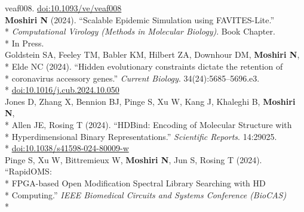 \documentclass[margin,line]{res}
\begin{document}
\begin{resume}
\hspace*{7mm} veaf008. \href{https://doi.org/10.1093/ve/veaf008}{doi:10.1093/ve/veaf008}\\
\hspace*{4mm} \textbf{Moshiri N} (2024). ``Scalable Epidemic Simulation using FAVITES-Lite.''\\*
\hspace*{9mm} \textit{Computational Virology (Methods in Molecular Biology)}. Book Chapter.\\*\vspace{2mm}
\hspace*{8mm} In Press.\\
\hspace*{4mm} Goldstein SA, Feeley TM, Babler KM, Hilbert ZA, Downhour DM, \textbf{Moshiri N},\\*
\hspace*{9mm} Elde NC (2024). ``Hidden evolutionary constraints dictate the retention of\\*
\hspace*{9mm} coronavirus accessory genes.'' \textit{Current Biology}. 34(24):5685--5696.e3.\\*\vspace{2mm}
\hspace*{8mm} \href{https://doi.org/10.1016/j.cub.2024.10.050}{doi:10.1016/j.cub.2024.10.050}\\
\hspace*{4mm} Jones D, Zhang X, Bennion BJ, Pinge S, Xu W, Kang J, Khaleghi B, \textbf{Moshiri N},\\*
\hspace*{9mm} Allen JE, Rosing T (2024). ``HDBind: Encoding of Molecular Structure with\\*
\hspace*{9mm} Hyperdimensional Binary Representations.'' \textit{Scientific Reports}. 14:29025.\\*\vspace{2mm}
\hspace*{8mm} \href{https://doi.org/10.1038/s41598-024-80009-w}{doi:10.1038/s41598-024-80009-w}\\
\hspace*{4mm} Pinge S, Xu W, Bittremieux W, \textbf{Moshiri N}, Jun S, Rosing T (2024). ``RapidOMS:\\*
\hspace*{9mm} FPGA-based Open Modification Spectral Library Searching with HD\\*
\hspace*{9mm} Computing.'' \textit{IEEE Biomedical Circuits and Systems Conference (BioCAS)}\\*\vspace{2mm}

\end{resume}
\end{document}
